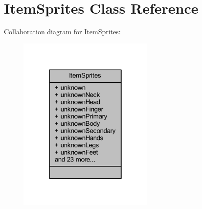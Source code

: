 \hypertarget{class_item_sprites}{}\section{Item\+Sprites Class Reference}
\label{class_item_sprites}


Collaboration diagram for Item\+Sprites\+:
\nopagebreak
\begin{figure}[H]
\begin{center}
\leavevmode
\includegraphics[width=190pt]{class_item_sprites__coll__graph}
\end{center}
\end{figure}
